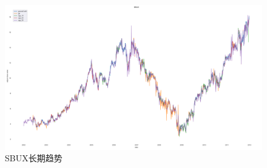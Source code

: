 \begin{figure}[!htbp]
    \centering
    \includegraphics[width=\textwidth]{images/lab3/SBUX_trend.png}
    \caption{SBUX长期趋势}\label{3lab3SBUXtrend}
\end{figure}



